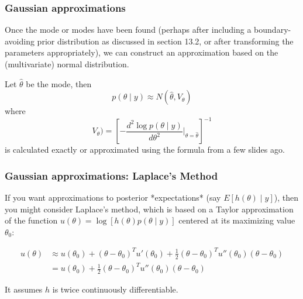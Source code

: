 \documentclass{beamer}
\begin{document}
\begin{frame}[fragile]
\frametitle{Gaussian approximations}

Once the mode or modes have been found (perhaps after including a boundary-avoiding prior distribution as discussed in section 13.2, or after transforming the parameters appropriately), we can construct an approximation based on the (multivariate) normal distribution. 
\newline

Let $\hat{\theta}$ be the mode, then 
$$
p(\theta \mid y) \approx N(\hat{\theta}, V_{\theta})
$$
where 
$$
V_{\theta}) = \left[- \frac{d^2 \log p(\theta \mid y) }{d\theta^2}\bigg\rvert_{\theta = \hat{\theta}} \right]^{-1}
$$
is calculated exactly or approximated using the formula from a few slides ago.

\end{frame}


\begin{frame}[fragile]
\frametitle{Gaussian approximations: Laplace's Method}

If you want approximations to posterior *expectations* (say $E[h(\theta) \mid y]$), then you might consider Laplace's method, which is based on a Taylor approximation of the function $u(\theta) = \log[h(\theta)p(\theta \mid y)]$ centered at its maximizing value $\theta_0$:
\newline

\begin{align*}
u(\theta) &\approx u(\theta_0) + (\theta - \theta_0)^Tu'(\theta_0) + \frac{1}{2}(\theta - \theta_0)^T u''(\theta_0)(\theta - \theta_0) \\
&= u(\theta_0) + \frac{1}{2}(\theta - \theta_0)^T u''(\theta_0)(\theta - \theta_0)
\end{align*}

It assumes $h$ is twice continuously differentiable.


\end{frame}
\end{document}
